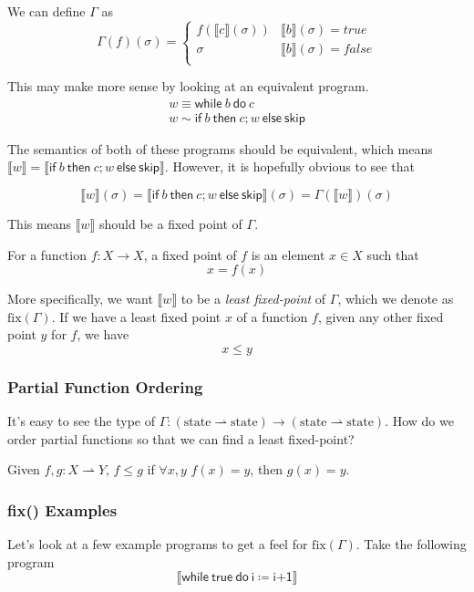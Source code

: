 \documentclass{lecturenotes}
\newcommand{\funcdef}[4]{#1 \colon #2 #3 #4}
\newcommand{\totfunc}[3]{\funcdef{#1}{#2}{\rightarrow}{#3}}
\newcommand{\parfunc}[3]{\funcdef{#1}{#2}{\rightharpoonup}{#3}}
\newcommand{\sem}[1]{\llbracket #1 \rrbracket}
\newcommand{\semapp}[2]{\sem{#1}(#2)}
\newcommand{\semappsig}[1]{\semapp{#1}{\sigma}}
\newcommand{\imp}[1]{\textsf{#1}}
\begin{document}
\noindent We can define $\Gamma$ as
\[
  \Gamma(f)(\sigma) = \begin{cases}
    f(\semappsig{c}) & \semappsig{b} = true \\
    \sigma  & \semappsig{b} = false \\
  \end{cases}
\]

\noindent This may make more sense by looking at an equivalent program.
\begin{gather*}
  w \equiv \imp{while}~b~\imp{do}~c \\
  w \sim \imp{if}~b~\imp{then}~c;w~\imp{else}~\imp{skip}
\end{gather*}

\noindent The semantics of both of these programs should be equivalent, which means $\sem{w} = \sem{\imp{if}~b~\imp{then}~c;w~\imp{else}~\imp{skip}}$.
However, it is hopefully obvious to see that

\[
  \semappsig{w} = \semappsig{\imp{if}~b~\imp{then}~c;w~\imp{else}~\imp{skip}} = \Gamma(\sem{w})(\sigma)
\]

\noindent This means $\sem{w}$ should be a fixed point of $\Gamma$.
\begin{defn}
  For a function $\totfunc{f}{X}{X}$, a fixed point of $f$ is an element $x \in X$ such that
  \[
    x = f(x)
  \]
\end{defn}

\noindent More specifically, we want $\sem{w}$ to be a \textit{least fixed-point} of $\Gamma$, which we denote as $\text{fix}(\Gamma)$.
If we have a least fixed point $x$ of a function $f$, given any other fixed point $y$ for $f$, we have
\[
  x \leq y 
\]

\subsubsection{Partial Function Ordering}
\noindent It's easy to see the type of $\totfunc{\Gamma}
                                                {(\text{state}\rightharpoonup\text{state})}
                                                {(\text{state}\rightharpoonup\text{state})}$.
How do we order partial functions so that we can find a least fixed-point?

\begin{defn}
  Given $\parfunc{f,g}{X}{Y}$, $f \leq g$ if $\forall x,y$ $f(x) = y$, then $g(x) = y$.
\end{defn}

\subsubsection{fix(\Gamma) Examples}
Let's look at a few example programs to get a feel for $\text{fix}(\Gamma)$.
Take the following program
\[
  \sem{\imp{while}~\imp{true}~\imp{do}~\imp{i}\coloneq\imp{i+1}}
\]
\end{document}
